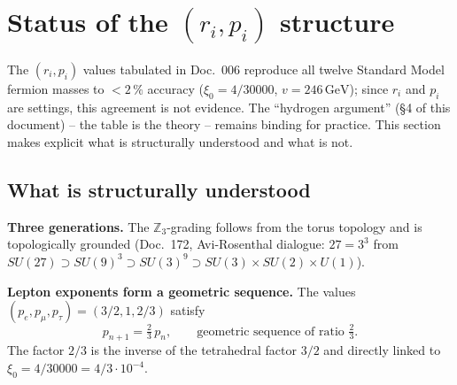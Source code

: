 \begin{center}
{\setlength{\hfuzz}{5pt}\scriptsize
{}}
\end{center}

\section{Status of the \texorpdfstring{$(r_i, p_i)$}{(r_i, p_i)} structure}
\label{sec:status-r-p}

The $(r_i, p_i)$ values tabulated in Doc.~006 reproduce all twelve
Standard Model fermion masses to $<2\,\%$ accuracy
($\xi_0 = 4/30000$, $v = 246\,\text{GeV}$); since $r_i$ and $p_i$ are
settings, this agreement is not evidence. The \enquote{hydrogen
argument} (§4 of this document) -- the table is the theory --
remains binding for practice. This section makes explicit what is
structurally understood and what is not.

\subsection{What is structurally understood}

\textbf{Three generations.} The $\mathbb{Z}_3$-grading follows from
the torus topology and is topologically grounded (Doc.~172,
Avi-Rosenthal dialogue: $27 = 3^3$ from
$SU(27) \supset SU(9)^3 \supset SU(3)^9 \supset
SU(3) \times SU(2) \times U(1)$).

\textbf{Lepton exponents form a geometric sequence.}
The values $(p_e, p_\mu, p_\tau) = (3/2, 1, 2/3)$ satisfy
\begin{equation}
  p_{n+1} = \tfrac{2}{3}\, p_n, \qquad
  \text{geometric sequence of ratio } \tfrac{2}{3}.
\end{equation}
The factor $2/3$ is the inverse of the tetrahedral factor $3/2$
and directly linked to $\xi_0 = 4/30000 = 4/3 \cdot 10^{-4}$.

